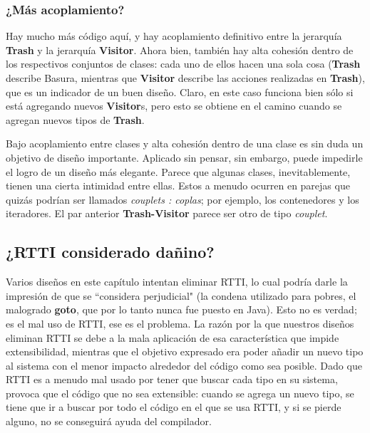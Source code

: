 \subsubsection*{¿Más acoplamiento?}
\label{subsubsec:moreA}


Hay mucho más código aquí, y hay acoplamiento definitivo entre la jerarquía \textbf{Trash} y la jerarquía \textbf{Visitor}. Ahora bien, también hay alta cohesión dentro de los respectivos conjuntos de clases: cada uno de ellos hacen una sola cosa (\textbf{Trash} describe Basura, mientras que \textbf{Visitor} describe las acciones realizadas en \textbf{Trash}), que es un indicador de un buen diseño. Claro, en este caso funciona bien sólo si está agregando nuevos \textbf{Visitor}s, pero esto se obtiene en el camino cuando se agregan nuevos tipos de \textbf{Trash}.          \newline

Bajo acoplamiento entre clases y alta cohesión dentro de una clase es sin duda un objetivo de diseño importante. Aplicado sin pensar, sin embargo, puede impedirle el logro de un diseño más elegante. Parece que algunas clases, inevitablemente, tienen una cierta intimidad entre ellas. Estos a menudo ocurren en parejas que quizás podrían ser llamados \textit{couplets : coplas}; por ejemplo, los contenedores y los iteradores. El par anterior \textbf{Trash-Visitor} parece ser otro de tipo \textit{couplet}.    \newline

\subsection*{¿RTTI considerado dañino?}
\label{subsec:rtticd}

Varios diseños en este capítulo intentan eliminar RTTI, lo cual podría darle la impresión de que se “considera perjudicial" (la condena utilizado para pobres, el malogrado \textbf{goto}, que por lo tanto nunca fue puesto en Java). Esto no es verdad; es el mal uso de RTTI, ese es el problema. La razón por la que nuestros diseños eliminan RTTI se debe a la mala aplicación de esa característica que impide extensibilidad, mientras que el objetivo expresado era poder añadir un nuevo tipo al sistema con el menor impacto alrededor del código como sea posible. Dado que RTTI es a menudo mal usado por tener que buscar cada tipo en su sistema, provoca que el código que no sea extensible: cuando se agrega un nuevo tipo, se tiene que ir a buscar por todo el código en el que se usa RTTI, y si se pierde alguno, no se conseguirá ayuda del compilador.     \newline

